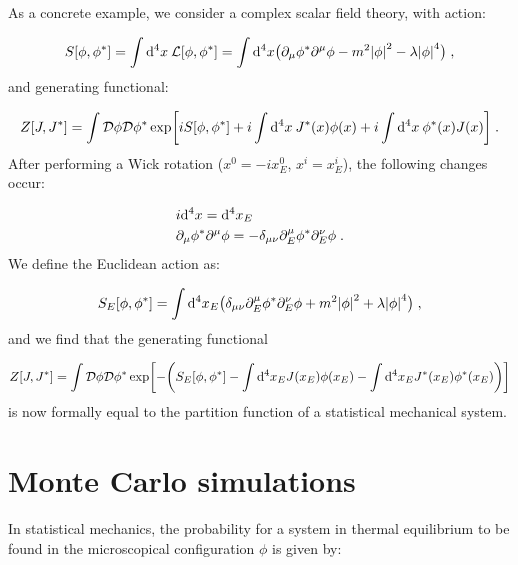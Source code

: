 As a concrete example, we consider a complex scalar field theory, with action:

\begin{equation}
S[\phi,\phi^*] = \int \mathrm{d}^4x \: \mathcal L[\phi,\phi^*] = \int \mathrm{d}^4x \bigl( \partial_{\mu} \phi^* \partial^{\mu} \phi - m^2 \abs{\phi}^2 -\lambda \abs{\phi}^4 \bigr) \; ,
\end{equation}
%
and generating functional:

\begin{equation}
Z[J,J^*] = \int \mathcal D \phi \mathcal D \phi^* \exp \biggl[ i S[\phi,\phi^*] + i \int \mathrm{d}^4x \: J^*(x) \phi(x) + i \int \mathrm{d}^4x \: \phi^*(x) J(x) \biggr] \; .
\label{scalar_gen_functional}
\end{equation}
%
After performing a Wick rotation ($x^0 = -i x^0_E$, $x^i = x^i_E$), the following changes occur:

\begin{equation}
\begin{split}
& i\mathrm{d}^4x =  \mathrm{d}^4x_E \\
& \partial_{\mu} \phi^* \partial^{\mu} \phi = - \delta_{\mu\nu} \partial^{\mu}_E \phi^* \partial^{\nu}_E \phi \; .
\end{split}
\end{equation}
%
We define the Euclidean action as:

\begin{equation}
S_E[\phi,\phi^*] = \int \mathrm{d}^4x_E \bigl( \delta_{\mu\nu} \partial^{\mu}_E \phi^* \partial^{\nu}_E \phi + m^2 \abs{\phi}^2 + \lambda \abs{\phi}^4  \bigr) \; ,
\end{equation}
%
and we find that the generating functional

\begin{equation}
Z[J,J^*] = \int \mathcal D \phi \mathcal D \phi^* \exp \biggl[ - \biggl( S_E[\phi,\phi^*] - \int \mathrm{d}^4x_E J(x_E) \phi(x_E) - \int \mathrm{d}^4x_E J^*(x_E) \phi^*(x_E) \biggr) \biggr] 
\end{equation}
%
is now formally equal to the partition function of a statistical mechanical system.


\section{Monte Carlo simulations}

In statistical mechanics, the probability for a system in thermal equilibrium to be found in the microscopical configuration $\phi$ is given by:

